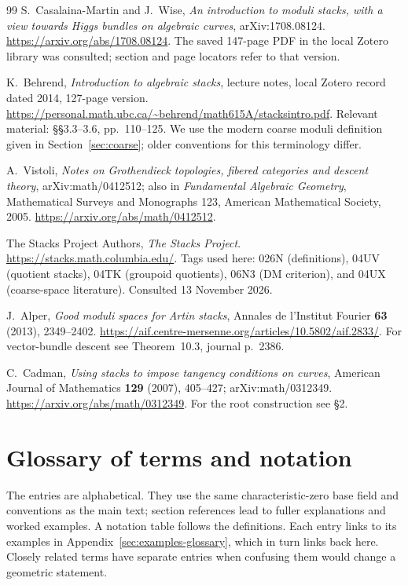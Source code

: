 \documentclass[11pt,a4paper]{article}
\numberwithin{equation}{section}
\theoremstyle{definition}
\begin{document}
\begin{thebibliography}{99}
S.~Casalaina-Martin and J.~Wise,
\emph{An introduction to moduli stacks, with a view towards Higgs bundles
on algebraic curves}, arXiv:1708.08124.
\url{https://arxiv.org/abs/1708.08124}.
The saved 147-page PDF in the local Zotero library was consulted;
section and page locators refer to that version.

K.~Behrend, \emph{Introduction to algebraic stacks}, lecture notes,
local Zotero record dated 2014, 127-page version.
\url{https://personal.math.ubc.ca/~behrend/math615A/stacksintro.pdf}.
Relevant material: \S\S3.3--3.6, pp.~110--125. We use the modern coarse
moduli definition given in Section~\ref{sec:coarse}; older conventions
for this terminology differ.

A.~Vistoli, \emph{Notes on Grothendieck topologies, fibered categories
and descent theory}, arXiv:math/0412512; also in
\emph{Fundamental Algebraic Geometry}, Mathematical Surveys and
Monographs 123, American Mathematical Society, 2005.
\url{https://arxiv.org/abs/math/0412512}.

The Stacks Project Authors, \emph{The Stacks Project}.
\url{https://stacks.math.columbia.edu/}.
Tags used here: 026N (definitions), 04UV (quotient stacks),
04TK (groupoid quotients), 06N3 (DM criterion), and 04UX (coarse-space
literature). Consulted 13 November 2026.

J.~Alper, \emph{Good moduli spaces for Artin stacks},
Annales de l'Institut Fourier \textbf{63} (2013), 2349--2402.
\url{https://aif.centre-mersenne.org/articles/10.5802/aif.2833/}.
For vector-bundle descent see Theorem~10.3, journal p.~2386.

C.~Cadman, \emph{Using stacks to impose tangency conditions on curves},
American Journal of Mathematics \textbf{129} (2007), 405--427;
arXiv:math/0312349.
\url{https://arxiv.org/abs/math/0312349}.
For the root construction see \S2.
\end{thebibliography}

\clearpage
\section{Glossary of terms and notation}
\label{sec:glossary}

The entries are alphabetical. They use the same characteristic-zero base
field and conventions as the main text; section references lead to fuller
explanations and worked examples. A notation table follows the definitions. Each entry links to its examples
in Appendix~\ref{sec:examples-glossary}, which in turn links back here.
Closely related terms have separate entries when confusing them would
change a geometric statement.
\end{document}
